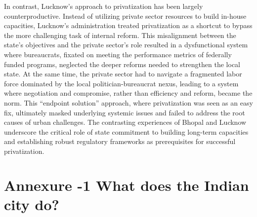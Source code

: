 In contrast, Lucknow's approach to privatization has been largely counterproductive. Instead of utilizing private sector resources to build in-house capacities, Lucknow's administration treated privatization as a shortcut to bypass the more challenging task of internal reform. This misalignment between the state's objectives and the private sector's role resulted in a dysfunctional system where bureaucrats, fixated on meeting the performance metrics of federally funded programs, neglected the deeper reforms needed to strengthen the local state. At the same time, the private sector had to navigate a fragmented labor force dominated by the local politician-bureaucrat nexus, leading to a system where negotiation and compromise, rather than efficiency and reform, became the norm. This ``endpoint solution'' approach, where privatization was seen as an easy fix, ultimately masked underlying systemic issues and failed to address the root causes of urban challenges. The contrasting experiences of Bhopal and Lucknow underscore the critical role of state commitment to building long-term capacities and establishing robust regulatory frameworks as prerequisites for successful privatization.


\section*{Annexure -1 What does the Indian city do?}

